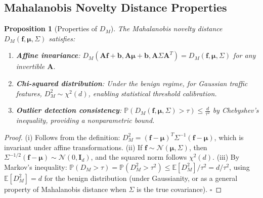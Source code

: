 \documentclass[11pt,a4paper]{article}
\newtheorem{proposition}[theorem]{Proposition}
\theoremstyle{definition}
\theoremstyle{remark}
\newcommand{\E}{\mathbb{E}}
\newcommand{\Pbb}{\mathbb{P}}
\newcommand{\flowvec}{\mathbf{f}}
\begin{document}
\subsection{Mahalanobis Novelty Distance Properties}

\begin{proposition}[Properties of $D_M$]
\label{prop:DM_props}
The Mahalanobis novelty distance $D_M(\flowvec, \boldsymbol{\mu}, \Sigma)$ satisfies:
\begin{enumerate}[label=(\roman*)]
    \item \textbf{Affine invariance}: $D_M(\mathbf{A}\flowvec + \mathbf{b}, \mathbf{A}\boldsymbol{\mu} + \mathbf{b}, \mathbf{A}\Sigma\mathbf{A}^T) = D_M(\flowvec, \boldsymbol{\mu}, \Sigma)$ for any invertible $\mathbf{A}$.
    \item \textbf{Chi-squared distribution}: Under the benign regime, for Gaussian traffic features, $D_M^2 \sim \chi^2(d)$, enabling statistical threshold calibration.
    \item \textbf{Outlier detection consistency}: $\Pbb(D_M(\flowvec, \boldsymbol{\mu}, \Sigma) > \tau) \leq \frac{d}{\tau^2}$ by Chebyshev's inequality, providing a nonparametric bound.
\end{enumerate}
\end{proposition}

\begin{proof}
(i) Follows from the definition: $D_M^2 = (\flowvec - \boldsymbol{\mu})^T \Sigma^{-1} (\flowvec - \boldsymbol{\mu})$, which is invariant under affine transformations. (ii) If $\flowvec \sim \mathcal{N}(\boldsymbol{\mu}, \Sigma)$, then $\Sigma^{-1/2}(\flowvec - \boldsymbol{\mu}) \sim \mathcal{N}(0, \mathbf{I}_d)$, and the squared norm follows $\chi^2(d)$. (iii) By Markov's inequality: $\Pbb(D_M > \tau) = \Pbb(D_M^2 > \tau^2) \leq \E[D_M^2] / \tau^2 = d / \tau^2$, using $\E[D_M^2] = d$ for the benign distribution (under Gaussianity, or as a general property of Mahalanobis distance when $\Sigma$ is the true covariance). $\square$
\end{proof}
\end{document}
